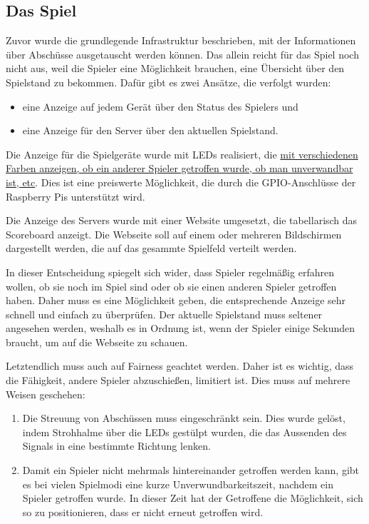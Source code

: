 \subsection{Das Spiel}
Zuvor wurde die grundlegende Infrastruktur beschrieben, mit der Informationen über Abschüsse
ausgetauscht werden können.
Das allein reicht für das Spiel noch nicht aus, weil die Spieler eine Möglichkeit brauchen, eine
Übersicht über den Spielstand zu bekommen.
Dafür gibt es zwei Ansätze, die verfolgt wurden:
\begin{itemize}
  \item
    eine Anzeige auf jedem Gerät über den Status des Spielers und
  \item
    eine Anzeige für den Server über den aktuellen Spielstand.
\end{itemize}
Die Anzeige für die Spielgeräte wurde mit LEDs realisiert, die \hyperref[led-anzeige]{mit
verschiedenen Farben anzeigen, ob ein anderer Spieler getroffen wurde, ob man unverwandbar ist,
etc}.
Dies ist eine preiswerte Möglichkeit, die durch die GPIO-Anschlüsse der Raspberry Pis unterstützt
wird.

Die Anzeige des Servers wurde mit einer Website umgesetzt, die tabellarisch das Scoreboard anzeigt.
Die Webseite soll auf einem oder mehreren Bildschirmen dargestellt werden, die auf das gesammte
Spielfeld verteilt werden.

In dieser Entscheidung spiegelt sich wider, dass Spieler regelmäßig erfahren wollen, ob sie noch im
Spiel sind oder ob sie einen anderen Spieler getroffen haben.
Daher muss es eine Möglichkeit geben, die entsprechende Anzeige sehr schnell und einfach zu
überprüfen.
Der aktuelle Spielstand muss seltener angesehen werden, weshalb es in Ordnung ist, wenn der Spieler
einige Sekunden braucht, um auf die Webseite zu schauen.

Letztendlich muss auch auf Fairness geachtet werden.
Daher ist es wichtig, dass die Fähigkeit, andere Spieler abzuschießen, limitiert ist.
Dies muss auf mehrere Weisen geschehen:
\begin{enumerate}
  \item
    Die Streuung von Abschüssen muss eingeschränkt sein.
    Dies wurde gelöst, indem Strohhalme über die LEDs gestülpt wurden, die das Aussenden des Signals
    in eine bestimmte Richtung lenken.
  \item
    Damit ein Spieler nicht mehrmals hintereinander getroffen werden kann, gibt es bei vielen
    Spielmodi eine kurze Unverwundbarkeitszeit, nachdem ein Spieler getroffen wurde.
    In dieser Zeit hat der Getroffene die Möglichkeit, sich so zu positionieren, dass er nicht
    erneut getroffen wird.
\end{enumerate}
